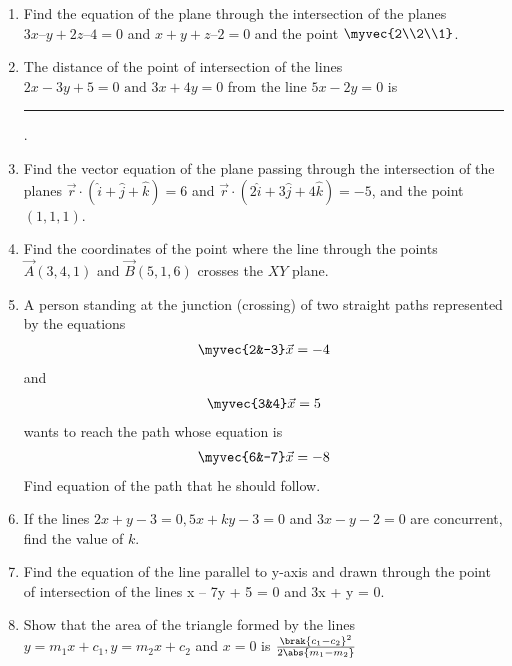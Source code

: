 \begin{enumerate}[label=\thesubsection.\arabic*, ref=\thesubsection.\theenumi]
	\item  Find the equation of the plane through the intersection of the planes $3{x} – {y} + 2{z} – 4 = 0 $ and $ {x} + {y} + {z} – 2 = 0$ and the point $\myvec{2\\2\\1}$.
		\label{prob:12/11/3/9/plane}
		\\
    \solution
		
\item The distance of the point of intersection of the lines $2x-3y+5=0 \text{ and }3x+4y=0$ from the line $5x-2y=0$ is
\rule{1cm}{0.1pt}.
\item Find the vector equation of the plane passing through the intersection of the planes $\overrightarrow{r} \cdot (\hat{i} +\hat{j} +\hat{k})=6$ and $\overrightarrow{r} \cdot (2\hat{i} +3\hat{j} +4\hat{k})=-5$,  and the point $(1,  1,  1)$.
\item Find the coordinates of the point where the line through the points $\vec{A}(3, 4, 1)$ and $\vec{B}(5,  1,  6)$ crosses the $XY$ plane.
    \item A person standing at the junction (crossing) of two straight paths 
    represented by the equations 
    \begin{align}
        \myvec{2&-3}\vec{x} = -4 
        \label{eq:chapters/11/10/4/24/L1}
    \end{align}
    and
    \begin{align}
        \myvec{3&4}\vec{x} = 5
        \label{eq:chapters/11/10/4/24/L2}
    \end{align} 
    wants to reach the path whose equation is 
    \begin{align}
        \myvec{6&-7}\vec{x} = -8
        \label{eq:chapters/11/10/4/24/L3}
    \end{align}
    Find equation of the path that he should follow.
\\
    \solution 
		
\item If the lines $2x+y-3=0,  5x+ky-3=0$ and $3x-y-2=0$ are concurrent,  find the value of $k$.
	\item  Find the equation of the line parallel to y-axis and drawn through the point of
intersection of the lines x – 7y + 5 = 0 and 3x + y = 0.
\\
\solution
		
\item Show that the area of the triangle formed by the lines $y=m_1x+c_1,  y=m_2x+c_2$ and $x=0$ is $\frac{\brak{c_1-c_2}^2}{2\abs{m_1-m_2}}$

\end{enumerate}
